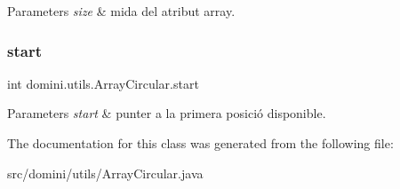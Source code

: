 \begin{DoxyParams}{Parameters}
{\em size} & mida del atribut array. \\
\hline
\end{DoxyParams}
\mbox{\label{classdomini_1_1utils_1_1ArrayCircular_a5206ac4a02c25c16c8a8ed50f65ea87b}} 
\subsubsection{\texorpdfstring{start}{start}}
{\footnotesize\ttfamily int domini.\+utils.\+Array\+Circular.\+start\hspace{0.3cm}{\ttfamily [private]}}


\begin{DoxyParams}{Parameters}
{\em start} & punter a la primera posició disponible. \\
\hline
\end{DoxyParams}


The documentation for this class was generated from the following file\+:\begin{DoxyCompactItemize}
\item 
src/domini/utils/Array\+Circular.\+java\end{DoxyCompactItemize}

